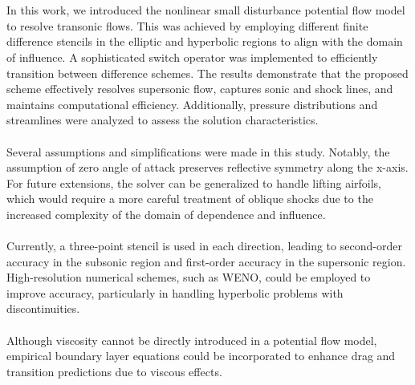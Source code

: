 \documentclass[12pt]{article}
\theoremstyle{definition}
\begin{document}
\\
\\
In this work, we introduced the nonlinear small disturbance potential flow model to resolve transonic flows. This was achieved by employing different finite difference stencils in the elliptic and hyperbolic regions to align with the domain of influence. A sophisticated switch operator was implemented to efficiently transition between difference schemes. The results demonstrate that the proposed scheme effectively resolves supersonic flow, captures sonic and shock lines, and maintains computational efficiency. Additionally, pressure distributions and streamlines were analyzed to assess the solution characteristics.\\
\\
Several assumptions and simplifications were made in this study. Notably, the assumption of zero angle of attack preserves reflective symmetry along the x-axis. For future extensions, the solver can be generalized to handle lifting airfoils, which would require a more careful treatment of oblique shocks due to the increased complexity of the domain of dependence and influence.\\
\\
Currently, a three-point stencil is used in each direction, leading to second-order accuracy in the subsonic region and first-order accuracy in the supersonic region. High-resolution numerical schemes, such as WENO, could be employed to improve accuracy, particularly in handling hyperbolic problems with discontinuities.\\
\\
Although viscosity cannot be directly introduced in a potential flow model, empirical boundary layer equations could be incorporated to enhance drag and transition predictions due to viscous effects.

\vspace{1cm}



\noindent {\bf }\\

\vspace{1cm}



\noindent {\bf }\\
\end{document}
